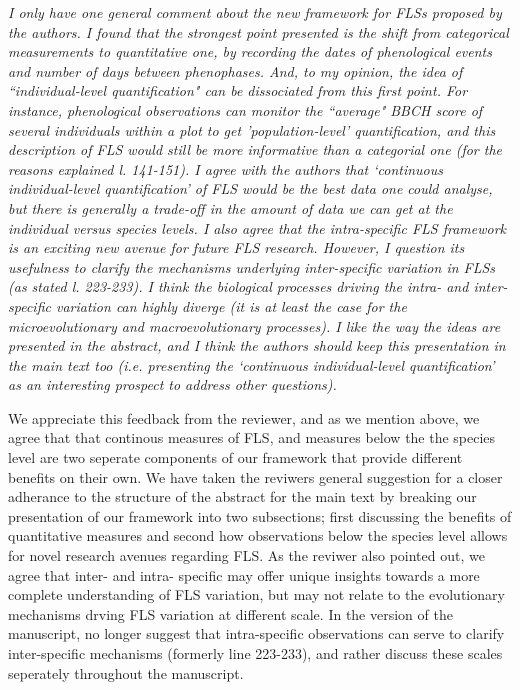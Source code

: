 \documentclass{article}[11pt]
\begin{document}
{\emph{I only have one general comment about the new framework for FLSs proposed by the authors. I found that the strongest point presented is the shift from categorical measurements to quantitative one, by recording the dates of phenological events and number of days between phenophases. And, to my opinion, the idea of ``individual-level quantification" can be dissociated from this first point. For instance, phenological observations can monitor the ``average" BBCH score of several individuals within a plot to get 'population-level' quantification, and this description of FLS would still be more informative than a categorial one (for the reasons explained l. 141-151). I agree with the authors that ‘continuous individual-level quantification’ of FLS would be the best data one could analyse, but there is generally a trade-off in the amount of data we can get at the individual versus species levels. I also agree that the intra-specific FLS framework is an exciting new avenue for future FLS research. However, I question its usefulness to clarify the mechanisms underlying inter-specific variation in FLSs (as stated l. 223-233). I think the biological processes driving the intra- and inter-specific variation can highly diverge (it is at least the case for the microevolutionary and macroevolutionary processes). I like the way the ideas are presented in the abstract, and I think the authors should keep this presentation in the main text too (i.e. presenting the ‘continuous individual-level quantification’ as an interesting prospect to address other questions).}

\noident We appreciate this feedback from the reviewer, and as we mention above, we agree that that continous measures of FLS, and measures below the the species level are two seperate components of our framework that provide different benefits on their own. We have taken the reviwers general suggestion for a closer adherance to the structure of the abstract for the main text by breaking our presentation of our framework into two subsections; first discussing the benefits of quantitative measures and second how observations below the species level allows for novel research avenues regarding FLS. As the reviwer also pointed out, we agree that inter- and intra- specific may offer unique insights towards a more complete understanding of FLS variation, but may not relate to the evolutionary mechanisms drving FLS variation at different scale. In the version of the manuscript, no longer suggest that intra-specific observations can serve to clarify inter-specific mechanisms (formerly line 223-233), and rather discuss these scales seperately throughout the manuscript.\\



}
\end{document}
